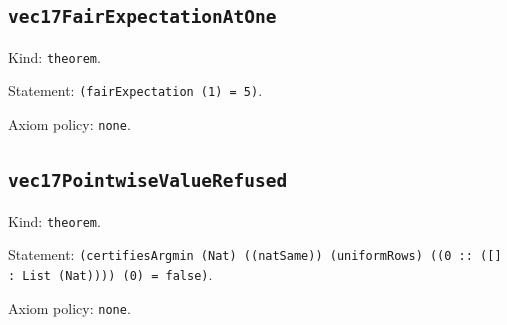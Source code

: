 \documentclass[11pt]{article}
\begin{document}
\subsection*{\texttt{vec17FairExpectationAtOne}}
\noindent Kind: \texttt{theorem}.\par
\noindent Statement: \texttt{(fairExpectation (1) = 5)}.\par
\noindent Axiom policy: \texttt{none}.\par
\subsection*{\texttt{vec17PointwiseValueRefused}}
\noindent Kind: \texttt{theorem}.\par
\noindent Statement: \texttt{(certifiesArgmin (Nat) ((natSame)) (uniformRows) ((0 :: ([] : List (Nat)))) (0) = false)}.\par
\noindent Axiom policy: \texttt{none}.\par
\end{document}
